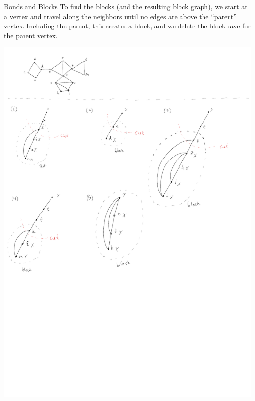 \documentclass[10pt]{extarticle}
\begin{document}
\begin{problem}{Bonds and Blocks}
    To find the blocks (and the resulting block graph), we start at a vertex and travel along the neighbors until no edges are above the ``parent'' vertex. Including the parent, this creates a block, and we delete the block save for the parent vertex.
    \begin{center}
      \includegraphics[width=\textwidth]{block_algorithm}
    \end{center}
  \end{problem}
\end{document}
